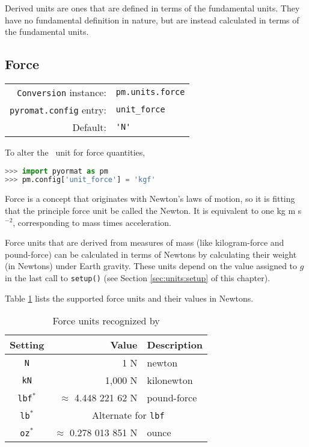 Derived units are ones that are defined in terms of the fundamental units.  They have no fundamental definition in nature, but are instead calculated in terms of the fundamental units.

%
%

\subsection{Force}\label{sec:units:force}

\begin{tabular}{rl}
\hline
\verb|Conversion| instance: & \verb|pm.units.force|\\
\verb|pyromat.config| entry: & \verb|unit_force|\\
Default: & \verb|'N'|\\
\hline
\end{tabular}
\vspace{1em}

To alter the \PM\ unit for force quantities,
\begin{lstlisting}[language=Python]
>>> import pyormat as pm
>>> pm.config['unit_force'] = 'kgf'
\end{lstlisting}

Force is a concept that originates with Newton's laws of motion, so it is fitting that the principle force unit be called the Newton.  It is equivalent to one kg m s$^{-2}$, corresponding to mass times acceleration.

Force units that are derived from measures of mass (like kilogram-force and pound-force) can be calculated in terms of Newtons by calculating their weight (in Newtons) under Earth gravity.  These units depend on the value assigned to $g$ in the last call to \verb|setup()| (see Section \ref{sec:units:setup} of this chapter).

Table \ref{tab:force} lists the supported force units and their values in Newtons.

\begin{table}
\centering
\caption{Force units recognized by \PM}\label{tab:force}
\begin{tabular}{crl}
\hline
Setting & Value & Description\\
\hline
\verb|N| & 1 N & newton\\
\verb|kN| & 1,000 N & kilonewton\\
\verb|lbf|$^*$ & $\approx$ 4.448 221 62 N & pound-force\\
\verb|lb|$^*$ & \multicolumn{2}{c}{Alternate for \texttt{lbf}}\\
\verb|oz|$^*$ & $\approx$ 0.278 013 851 N & ounce\\
\hline
\end{tabular}
\end{table}

